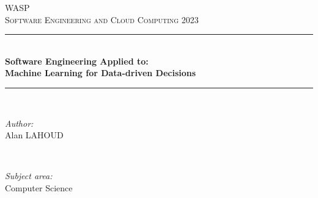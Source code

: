 \documentclass{article}
\begin{document}
\begin{titlepage}

\newcommand{\HRule}{\rule{\linewidth}{0.5mm}} %

\center %
 

\textsc{\LARGE WASP}\\[1.5cm] %
\textsc{\Large Software Engineering and Cloud Computing 2023}\\[0.5cm] %


\HRule \\[0.4cm]
{ \huge \bfseries Software Engineering Applied to: \\ Machine Learning for Data-driven Decisions}\\[0.4cm] %
\HRule \\[1.5cm]
 

\begin{minipage}{0.4\textwidth}
\begin{flushleft} \large
\emph{Author:}\\
Alan \textsc{LAHOUD}\\
\end{flushleft}
\end{minipage}
~
\begin{minipage}{0.4\textwidth}
\begin{flushright} \large
\emph{Subject area:} \\
Computer Science \\
\end{flushright}
\end{minipage}\\[2cm]


\end{titlepage}
\end{document}
